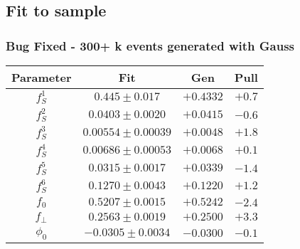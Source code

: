 \documentclass[aspectratio=43,9pt]{beamer}
\begin{document}
\subsection{Fit to sample} %
\begin{frame}[default] %
  \frametitle{Bug Fixed - 300+ k events generated with Gauss}
  
  \centering
  \begin{tabular}{cccc}
    \hline
    Parameter  &                   Fit  &      Gen  &  Pull \\
    \hline
    $                       f_S^{1} $&$           0.445 \pm 0.017 $&$ +0.4332 $&$ +0.7 $\\
    $                       f_S^{2} $&$         0.0403 \pm 0.0020 $&$ +0.0415 $&$ -0.6 $\\
    $                       f_S^{3} $&$       0.00554 \pm 0.00039 $&$ +0.0048 $&$ +1.8 $\\
    $                       f_S^{4} $&$       0.00686 \pm 0.00053 $&$ +0.0068 $&$ +0.1 $\\
    $                       f_S^{5} $&$         0.0315 \pm 0.0017 $&$ +0.0339 $&$ -1.4 $\\
    $                       f_S^{6} $&$         0.1270 \pm 0.0043 $&$ +0.1220 $&$ +1.2 $\\
    $                           f_0 $&$         0.5207 \pm 0.0015 $&$ +0.5242 $&$ -2.4 $\\
    $                     f_{\perp} $&$         0.2563 \pm 0.0019 $&$ +0.2500 $&$ +3.3 $\\
    $                        \phi_0 $&$        -0.0305 \pm 0.0034 $&$ -0.0300 $&$ -0.1 $\\

\end{tabular}
\end{frame}
\end{document}
